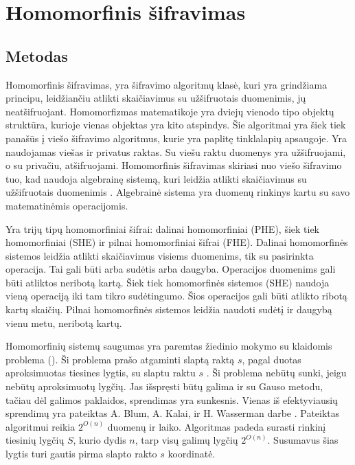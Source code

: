 \documentclass{VUMIFInfBakalaurinis}
\begin{document}
\section{Homomorfinis šifravimas}
\subsection{Metodas}
\par Homomorfinis šifravimas, yra šifravimo algoritmų klasė, kuri yra grindžiama principu, leidžiančiu atlikti skaičiavimus su užšifruotais duomenimis, jų neatšifruojant. Homomorfizmas matematikoje yra dviejų vienodo tipo objektų struktūra, kurioje vienas objektas yra kito atspindys.  Šie algoritmai yra šiek tiek panašūs į viešo šifravimo algoritmus, kurie yra paplitę tinklalapių apsaugoje. Yra naudojamas viešas ir privatus raktas. Su viešu raktu duomenys yra užšifruojami, o su privačiu, atšifruojami. Homomorfinis šifravimas skiriasi nuo viešo šifravimo tuo, kad naudoja algebrainę sistemą, kuri leidžia atlikti skaičiavimus su užšifruotais duomenimis \cite{14}. Algebrainė sistema yra duomenų rinkinys kartu su savo matematinėmis operacijomis.
\par Yra trijų tipų homomorfiniai šifrai: dalinai homomorfiniai (PHE), šiek tiek homomorfiniai (SHE) ir pilnai homomorfiniai šifrai (FHE). Dalinai homomorfinės sistemos leidžia atlikti skaičiavimus visiems duomenims, tik su pasirinkta operacija. Tai gali būti arba sudėtis arba daugyba.  Operacijos duomenims gali būti atliktos neribotą kartą.  Šiek tiek homomorfinės sistemos (SHE) naudoja vieną operaciją iki tam tikro sudėtingumo. Šios operacijos gali būti atlikto ribotą kartų skaičių. Pilnai homomorfinės sistemos leidžia naudoti sudėtį ir daugybą vienu metu, neribotą kartų. 
\par Homomorfinių sistemų saugumas yra paremtas žiedinio mokymo su klaidomis problema (). Ši problema prašo atgaminti slaptą raktą $s$, pagal duotas aproksimuotas tiesines lygtis, su slaptu raktu $s$ \cite{16}. Ši problema nebūtų sunki, jeigu nebūtų aproksimuotų lygčių. Jas išspręsti būtų galima ir su Gauso metodu, tačiau dėl galimos paklaidos, sprendimas yra sunkesnis. Vienas iš efektyviausių sprendimų yra pateiktas A. Blum, A. Kalai, ir H. Wasserman darbe \cite{15}. Pateiktas algoritmui reikia $2^{O(n)}$ duomenų ir laiko. Algoritmas padeda surasti rinkinį tiesinių lygčių $S$, kurio dydis $n$, tarp visų galimų lygčių $2^{O(n)}$. Susumavus šias lygtis turi gautis pirma slapto rakto $s$ koordinatė.
\end{document}
